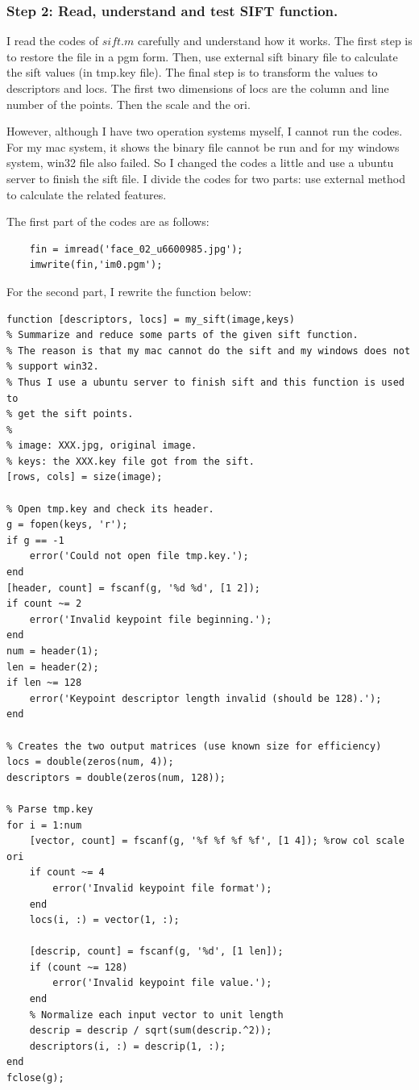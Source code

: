 \documentclass{article}
\begin{document}
\subsubsection*{Step 2: Read, understand and test SIFT function.}

I read the codes of $sift.m$ carefully and understand how it works. The first step is to restore the file in a pgm form. Then, use external sift binary file to calculate the sift values (in tmp.key file). The final step is to transform the values to descriptors and locs. The first two dimensions of locs are the column and line number of the points. Then the scale and the ori.

However, although I have two operation systems myself, I cannot run the codes. For my mac system, it shows the binary file cannot be run and for my windows system, win32 file also failed. So I changed the codes a little and use a ubuntu server to finish the sift file. I divide the codes for two parts: use external method to calculate the related features.

The first part of the codes are as follows:

\begin{lstlisting}
    fin = imread('face_02_u6600985.jpg');
    imwrite(fin,'im0.pgm');
\end{lstlisting}

For the second part, I rewrite the function below:
\begin{lstlisting}
function [descriptors, locs] = my_sift(image,keys)
% Summarize and reduce some parts of the given sift function.
% The reason is that my mac cannot do the sift and my windows does not
% support win32.
% Thus I use a ubuntu server to finish sift and this function is used to
% get the sift points.
%
% image: XXX.jpg, original image.
% keys: the XXX.key file got from the sift.
[rows, cols] = size(image); 

% Open tmp.key and check its header.
g = fopen(keys, 'r');
if g == -1
    error('Could not open file tmp.key.');
end
[header, count] = fscanf(g, '%d %d', [1 2]);
if count ~= 2
    error('Invalid keypoint file beginning.');
end
num = header(1);
len = header(2);
if len ~= 128
    error('Keypoint descriptor length invalid (should be 128).');
end

% Creates the two output matrices (use known size for efficiency)
locs = double(zeros(num, 4));
descriptors = double(zeros(num, 128));

% Parse tmp.key
for i = 1:num
    [vector, count] = fscanf(g, '%f %f %f %f', [1 4]); %row col scale ori
    if count ~= 4
        error('Invalid keypoint file format');
    end
    locs(i, :) = vector(1, :);
    
    [descrip, count] = fscanf(g, '%d', [1 len]);
    if (count ~= 128)
        error('Invalid keypoint file value.');
    end
    % Normalize each input vector to unit length
    descrip = descrip / sqrt(sum(descrip.^2));
    descriptors(i, :) = descrip(1, :);
end
fclose(g);

\end{lstlisting}
\end{document}
